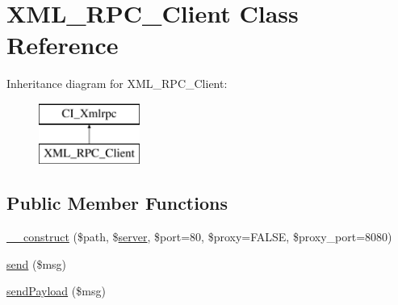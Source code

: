 \hypertarget{class_x_m_l___r_p_c___client}{}\section{X\+M\+L\+\_\+\+R\+P\+C\+\_\+\+Client Class Reference}
\label{class_x_m_l___r_p_c___client}
Inheritance diagram for X\+M\+L\+\_\+\+R\+P\+C\+\_\+\+Client\+:\begin{figure}[H]
\begin{center}
\leavevmode
\includegraphics[height=2.000000cm]{class_x_m_l___r_p_c___client}
\end{center}
\end{figure}
\subsection*{Public Member Functions}
\begin{DoxyCompactItemize}
\item 
\mbox{\hyperlink{class_x_m_l___r_p_c___client_ab665c9b62c100416c6c1e20ec650f553}{\+\_\+\+\_\+construct}} (\$path, \$\mbox{\hyperlink{class_c_i___xmlrpc_a9969815a7195f6915eb73afcab3f9e9e}{server}}, \$port=80, \$proxy=F\+A\+L\+SE, \$proxy\+\_\+port=8080)
\item 
\mbox{\hyperlink{class_x_m_l___r_p_c___client_a10284ca4704ff9e94185f95baa21973f}{send}} (\$msg)
\item 
\mbox{\hyperlink{class_x_m_l___r_p_c___client_a040f0b8dcbcaac6a33ca0541befed955}{send\+Payload}} (\$msg)
\end{DoxyCompactItemize}
